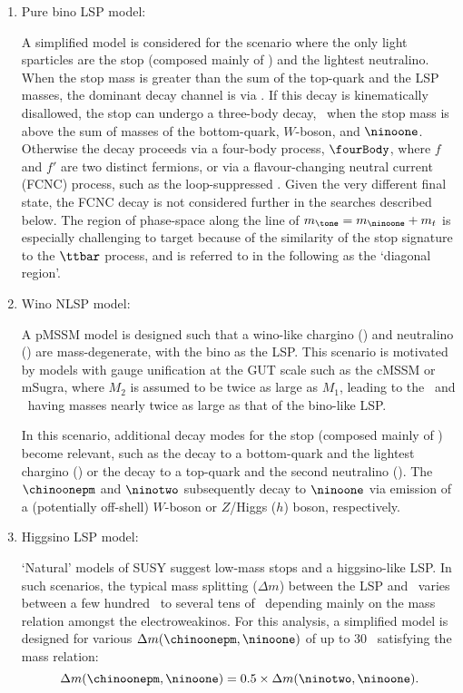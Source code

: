 \documentclass[UKenglish,10pt]{article}
\begin{document}
\begin{enumerate}[label=(\alph*)]

\item Pure bino LSP model:

A simplified model is considered for the scenario where the only light sparticles are the stop (composed mainly of \tright) and the lightest neutralino. When the stop mass is greater than the sum of the top-quark and the LSP masses, the dominant decay channel is via \topLSP. If this decay is kinematically disallowed, the stop can undergo a three-body decay, \threeBody\, when the stop mass is above the sum of masses of the bottom-quark, $W$-boson, and $\ninoone$. Otherwise the decay proceeds via a four-body process, $\fourBody$, where $f$ and $f'$ are two distinct fermions, or via a flavour-changing neutral current (FCNC) process, such as the loop-suppressed \charmDecay. Given the very different final state, the FCNC decay is not considered further in the searches described below. The region of phase-space along the line of $m_{\tone} = m_{\ninoone} + m_t$ is especially challenging to target because of the similarity of the stop signature to the $\ttbar$ process, and is referred to in the following as the `diagonal region'.

\item Wino NLSP model:

A pMSSM model is designed such that a wino-like chargino (\chinoonepm) and neutralino (\ninotwo) are mass-degenerate, with the bino as the LSP. This scenario is motivated by models with gauge unification at the GUT scale such as the cMSSM or mSugra, where $M_2$ is assumed to be twice as large as $M_1$, leading to the \chinoonepm\ and \ninotwo\ having masses nearly twice as large as that of the bino-like LSP.

In this scenario, additional decay modes for the stop (composed mainly of \tleft) become relevant, such as the decay to a bottom-quark and the lightest chargino (\bChargino) or the decay to a top-quark and the second neutralino (\topNLSP). The $\chinoonepm$ and $\ninotwo$ subsequently decay to $\ninoone$ via emission of a (potentially off-shell) $W$-boson or $Z$/Higgs ($h$) boson, respectively. 

\item Higgsino LSP model:

`Natural' models of SUSY suggest low-mass stops and a higgsino-like LSP. In such scenarios, the typical mass splitting ($\Delta m$) between the LSP and \chinoonepm\ varies between a few hundred \MeV\ to several tens of \GeV\, depending mainly on the mass relation amongst the electroweakinos. For this analysis, a simplified model is designed for various $\Delta m(\chinoonepm,\ninoone)$ of up to 30 \GeV\ satisfying the mass relation:
\[
\Delta m(\chinoonepm,\ninoone) = 0.5 \times \Delta m(\ninotwo,\ninoone).
\]


\end{enumerate}
\end{document}
